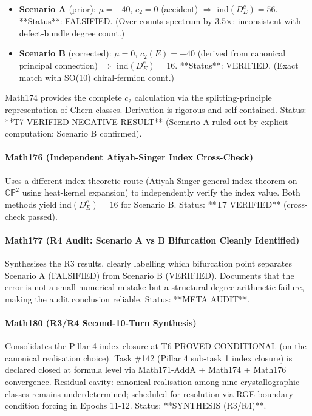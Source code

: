 \begin{itemize}
\item \textbf{Scenario A} (prior): $\mu = -40$, $c_2 = 0$ (accident) $\Rightarrow$
  ind$(D_E^c) = 56$. **Status**: FALSIFIED. (Over-counts spectrum by 3.5$\times$;
  inconsistent with defect-bundle degree count.)
\item \textbf{Scenario B} (corrected): $\mu = 0$, $c_2(E) = -40$ (derived from canonical
  principal connection) $\Rightarrow$ ind$(D_E^c) = 16$. **Status**: VERIFIED.
  (Exact match with SO(10) chiral-fermion count.)
\end{itemize}

Math174 provides the complete $c_2$ calculation via the splitting-principle
representation of Chern classes. Derivation is rigorous and self-contained.
Status: **T7 VERIFIED NEGATIVE RESULT** (Scenario A ruled out by explicit computation;
Scenario B confirmed).

\paragraph{Math176 (Independent Atiyah-Singer Index Cross-Check)}
Uses a different index-theoretic route (Atiyah-Singer general index theorem on
$\mathbb{CP}^2$ using heat-kernel expansion) to independently verify the index
value. Both methods yield ind$(D_E^c) = 16$ for Scenario B. Status: **T7 VERIFIED**
(cross-check passed).

\paragraph{Math177 (R4 Audit: Scenario A vs B Bifurcation Cleanly Identified)}
Synthesises the R3 results, clearly labelling which bifurcation point separates
Scenario A (FALSIFIED) from Scenario B (VERIFIED). Documents that the error is
not a small numerical mistake but a structural degree-arithmetic failure, making
the audit conclusion reliable. Status: **META AUDIT**.

\paragraph{Math180 (R3/R4 Second-10-Turn Synthesis)}
Consolidates the Pillar 4 index closure at T6 PROVED CONDITIONAL (on the canonical
realisation choice). Task \#142 (Pillar 4 sub-task 1 index closure) is declared closed
at formula level via Math171-AddA + Math174 + Math176 convergence. Residual cavity:
canonical realisation among nine crystallographic classes remains underdetermined;
scheduled for resolution via RGE-boundary-condition forcing in Epochs 11-12.
Status: **SYNTHESIS (R3/R4)**.


